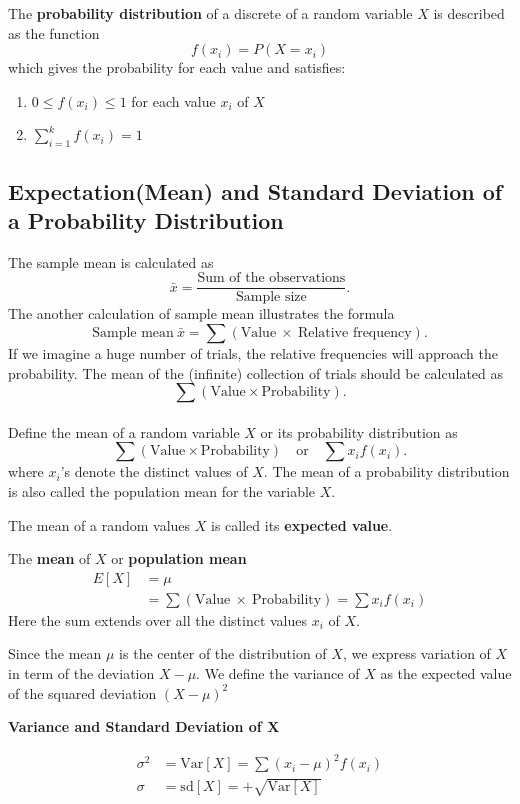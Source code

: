 \documentclass[12pt,openany]{book}
\theoremstyle{definition}
\newcommand{\dispsty}{\displaystyle}
\newcommand{\Var}{\text{Var}}
\newcommand{\sd}{\text{sd}}
\begin{document}
	\begin{tcolorbox}[colback=white]
		The \textbf{probability distribution} of a discrete of a random variable $X$ is described as the function \[
		f(x_i) = P(X=x_i)
		\] which gives the probability for each value and satisfies: \begin{enumerate}
			\item $0\leq f(x_i)\leq 1$ for each value $x_i$ of $X$
			\item \(\dispsty\sum_{i=1}^kf(x_i)=1 \)
		\end{enumerate}
	\end{tcolorbox}
	
	\subsection{Expectation(Mean) and Standard Deviation of a Probability Distribution}
	The sample mean is calculated as \[
	\bar{x}=\frac{\text{Sum of the observations}}{\text{Sample size}}.
	\] The another calculation of sample mean illustrates the formula \[
	\text{Sample mean}\ \bar{x} = \sum(\text{Value}\ \times\ \text{Relative frequency}).
	\] If we imagine a huge number of trials, the relative frequencies will approach the probability. The mean of the (infinite) collection of trials should be calculated as \[
	\sum(\text{Value}\times\text{Probability}).
	\]
	\\
	Define the mean of a random variable $X$ or its probability distribution as \[
	\sum(\text{Value}\times\text{Probability})\quad\text{or}\quad \sum x_if(x_i).
	\] where $x_i$'s denote the distinct values of $X$. The mean of a probability distribution is also called the population mean for the variable $X$. \par
	The mean of a random values $X$ is called its \textbf{expected value}. \begin{tcolorbox}[colback=white]
		The \textbf{mean} of $X$ or \textbf{population mean} \begin{align*}
			E[X] &= \mu \\
			&= \sum(\text{Value}\ \times\ \text{Probability})=\sum x_if(x_i)
		\end{align*} Here the sum extends over all the distinct values $x_i$ of $X$.
	\end{tcolorbox}
	Since the mean $\mu$ is the center of the distribution of $X$, we express variation of $X$ in term of the deviation $X-\mu$. We define the variance of $X$ as the expected value of the squared deviation $(X-\mu)^2$
	\begin{tcolorbox}[colback=white]\begin{center}
			\textbf{Variance and Standard Deviation of $\boldsymbol{X}$}
		\end{center}\begin{align*}
			\sigma^2 &=\Var[X]=\sum(x_i-\mu)^2f(x_i) \\
			\sigma &=\sd[X]= +\sqrt{\Var[X]}
		\end{align*}
	\end{tcolorbox}
\end{document}
